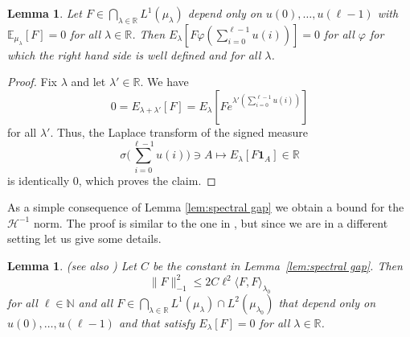 \documentclass[11pt, a4paper]{article}
\newtheorem{lemma}[theorem]{Lemma}
\newcommand{\CH}{\mathscr{H}}
\newcommand{\R}{\mathbb{R}}
\newcommand{\1}{\mathbf{1}}
\begin{document}
\begin{lemma}
  Let $F \in \bigcap_{\lambda \in \mathbb{R}} L^1 ({\mu}_{\lambda})$
  depend only on $u(0), \ldots, u(\ell - 1)$ with
  $\mathbb{E}_{{\mu}_{\lambda}} [F] = 0$ for all $\lambda \in
  \mathbb{R}$. Then $E_{\lambda} [F \varphi (\sum_{i = 0}^{\ell - 1} u(i))] =
  0$ for all $\varphi$ for which the right hand side is well defined and for
  all $\lambda$.
\end{lemma}

\begin{proof}
  Fix $\lambda$ and let $\lambda' \in \mathbb{R}$. We have
  \[ 0 = E_{\lambda + \lambda'} [F] = E_{\lambda} [F e^{\lambda' \left(
     \sum_{i = 0}^{\ell - 1} u(i) \right)}] \]
  for all $\lambda'$. Thus, the Laplace transform of the signed measure
  \[
     \sigma\Big(\sum_{i=0}^{\ell -1} u(i) \Big) \ni A \mapsto E_{\lambda} [F \1_A] \in \R
  \]
  is identically 0, which proves the claim.
\end{proof}

As a simple consequence of Lemma \ref{lem:spectral gap} we obtain a bound for
the $\CH^{- 1}$ norm. The proof is similar to the one in
\cite{bib:goncalvesJara}, but since we are in a different setting let us give
some details.

\begin{lemma}
  (see also \cite[Proposition~6]{bib:goncalvesJara})
  Let $C$ be the constant in
  Lemma~\ref{lem:spectral gap}. Then
  \[ \| F \|_{- 1}^2 \leqslant 2 C \ell^2 \langle F, F \rangle_{\lambda_0} \]
  for all $\ell \in \mathbb{N}$ and all $F \in \bigcap_{\lambda \in
  \mathbb{R}} L^1 ({\mu}_{\lambda}) \cap L^2 ({\mu}_{\lambda_0})$
  that depend only on $u(0), \ldots, u(\ell - 1)$ and that satisfy
  $E_{\lambda} [F] = 0$ for all $\lambda \in \mathbb{R}$.
\end{lemma}
\end{document}
